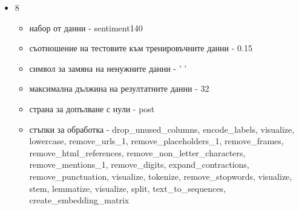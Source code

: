 \documentclass{article}
\begin{document}
\begin{itemize}
\item 8

\begin{itemize}
\item набор от данни - sentiment140
\item съотношение на тестовите към тренировъчните данни - 0.15
\item символ за замяна на ненужните данни - ' '
\item максимална дължина на резултатните данни - 32
\item страна за допълване с нули - post
\item стъпки за обработка - drop\_unused\_columns, encode\_labels, visualize, lowercase, remove\_urls\_1,
remove\_placeholders\_1, remove\_frames, remove\_html\_references, remove\_non\_letter\_characters,
remove\_mentions\_1, remove\_digits, expand\_contractions, remove\_punctuation, visualize, tokenize,
remove\_stopwords, visualize, stem, lemmatize, visualize, split, text\_to\_sequences, create\_embedding\_matrix
\end{itemize}


\end{itemize}
\end{document}
